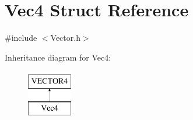 \hypertarget{struct_vec4}{
\section{Vec4 Struct Reference}
\label{struct_vec4}
}


{\ttfamily \#include $<$Vector.h$>$}

Inheritance diagram for Vec4:\begin{figure}[H]
\begin{center}
\leavevmode
\includegraphics[height=2.000000cm]{struct_vec4}
\end{center}
\end{figure}
